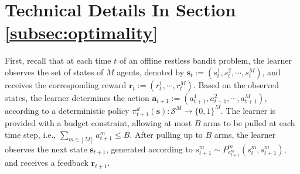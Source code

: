 \section{Technical Details In Section \ref{subsec:optimality}}\label{appendix:proof-of-reduction}
First, recall that
at each time $t$ of an offline restless bandit problem, 
the learner observes the set of states of $M$ agents, denoted by $\bm{s}_t:=\left(s_t^1,s_t^2,\cdots,s_t^M\right)$, and receives the corresponding reward $\bm{r}_t:=(r_t^1,\cdots, r_t^M)$. 
Based on the observed states, the learner determines the action $\bm{a}_{t+1}:=\left(a_{t+1}^1,a_{t+1}^2,\cdots,a_{t+1}^M\right)$,  according to a deterministic policy $\pi^d_{t+1}(\bm{s}):\mathcal{S}^M\rightarrow 
\{0,1\}^M$.
The learner is provided with a budget constraint, allowing at most $B$ arms to be pulled at each time step,
i.e., $\sum_{m\in[M]} a_{t+1}^m\leq B$.
After pulling up to $B$ arms, the learner
observes the next state $\bm{s}_{t+1}$, 
generated according to $s_{t+1}^m\sim P_{a_{t+1}^m}^m\left(s_t^m,s_{t+1}^m\right)$, and 
receives a feedback $\bm{r}_{t+1}$.

